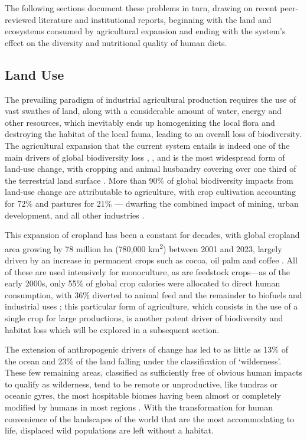 The following sections document these problems in turn, drawing on recent peer-reviewed literature and institutional reports, beginning with the land and ecosystems consumed by agricultural expansion and ending with the system's effect on the diversity and nutritional quality of human diets.

\subsection{Land Use}
The prevailing paradigm of industrial agricultural production requires the use of vast swathes of land, along with a considerable amount of water, energy and other resources, which inevitably ends up homogenizing the local flora and destroying the habitat of the local fauna, leading to an overall loss of biodiversity. The agricultural expansion that the current system entails is indeed one of the main drivers of global biodiversity loss \cite[412]{IPBES2019GlobalAssessment}, \cite[131]{euMethodology}, and is the most widespread form of land-use change, with cropping and animal husbandry covering over one third of the terrestrial land surface \cite[XVI]{IPBES2019GlobalAssessment}. More than 90\% of global biodiversity impacts from land-use change are attributable to agriculture, with crop cultivation accounting for 72\% and pastures for 21\% --- dwarfing the combined impact of mining, urban development, and all other industries \cite{cabernard2024biodiversity}.

This expansion of cropland has been a constant for decades, with global cropland area growing by 78 million ha (780,000 km\textsuperscript{2}) between 2001 and 2023, largely driven by an increase in permanent crops such as cocoa, oil palm and coffee \cite[p.~3]{FAO2025LandStats}. All of these are used intensively for monoculture, as are feedstock crops---as of the early 2000s, only 55\% of global crop calories were allocated to direct human consumption, with 36\% diverted to animal feed and the remainder to biofuels and industrial uses \cite[Table~2]{cassidy2013redefining}; this particular form of agriculture, which consists in the use of a single crop for large productions, is another potent driver of biodiversity and habitat loss which will be explored in a subsequent section.

The extension of anthropogenic drivers of change has led to as little as 13\% of the ocean and 23\% of the land falling under the classification of `wilderness'. These few remaining areas, classified as sufficiently free of obvious human impacts to qualify as wilderness, tend to be remote or unproductive, like tundras or oceanic gyres, the most hospitable biomes having been almost or completely modified by humans in most regions \cite[206]{IPBES2019GlobalAssessment}. With the transformation for human convenience of the landscapes of the world that are the most accommodating to life, displaced wild populations are left without a habitat.


